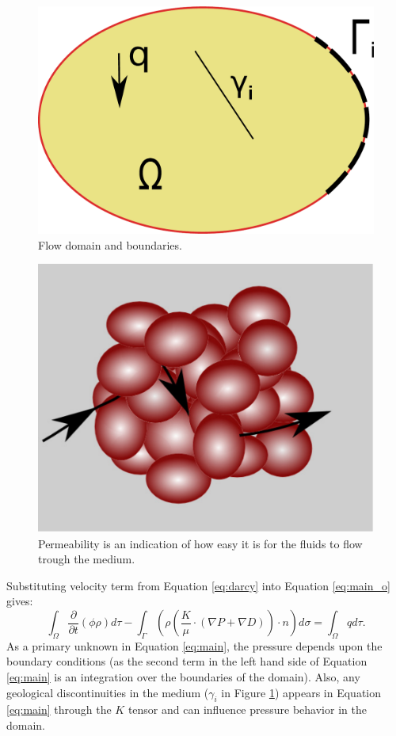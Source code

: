 \begin{figure}[thb] 
  \centering{}
  \includegraphics[scale=0.3]{./figurer/BCPB}
  \caption{Flow domain and boundaries.}
  \label{fig:prsDmn}
\end{figure}

\begin{figure}
 \centering{}
 \includegraphics[width=0.35\linewidth]{./figurer/singlePerm}
 \caption{Permeability is an indication of how easy it is for the fluids to flow
trough the medium.}
 \label{fig:snglK}
\end{figure}

Substituting velocity term from Equation \ref{eq:darcy} into Equation
\ref{eq:main_o} gives:
\begin{equation}
  \int_{\Omega}\frac{\partial}{\partial t}(\phi\rho)d\tau-\int_{\Gamma}(\rho
(\frac{K}{\mu}\cdot (\nabla{P}+\nabla{D})) \cdot n)d\sigma=\int_{\Omega}qd\tau.
  \label{eq:main}
\end{equation} As a primary unknown in Equation \ref{eq:main}, the pressure depends upon the boundary conditions (as the second term in the left hand side of
Equation \ref{eq:main} is an integration over the boundaries of the domain). Also, any geological discontinuities in the medium
($\gamma_i$ in Figure \ref{fig:prsDmn}) appears in Equation \ref{eq:main} through the $K$ tensor and can influence pressure behavior in the domain.

